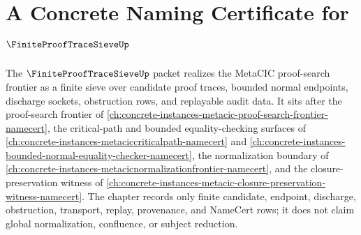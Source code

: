 \chapter{A Concrete Naming Certificate for $\FiniteProofTraceSieveUp$}
\label{ch:concrete-instances-finite-proof-trace-sieve-namecert}

The $\FiniteProofTraceSieveUp$ packet realizes the MetaCIC proof-search frontier as a finite sieve over candidate proof traces, bounded normal endpoints, discharge sockets, obstruction rows, and replayable audit data. It sits after the proof-search frontier of \autoref{ch:concrete-instances-metacic-proof-search-frontier-namecert}, the critical-path and bounded equality-checking surfaces of \autoref{ch:concrete-instances-metaciccriticalpath-namecert} and \autoref{ch:concrete-instances-bounded-normal-equality-checker-namecert}, the normalization boundary of \autoref{ch:concrete-instances-metacicnormalizationfrontier-namecert}, and the closure-preservation witness of \autoref{ch:concrete-instances-metacic-closure-preservation-witness-namecert}. The chapter records only finite candidate, endpoint, discharge, obstruction, transport, replay, provenance, and NameCert rows; it does not claim global normalization, confluence, or subject reduction.

